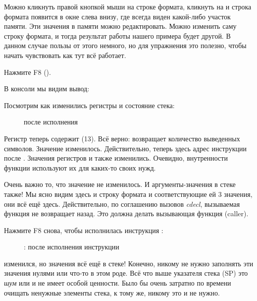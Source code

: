Можно кликнуть правой кнопкой мыши на строке формата, кликнуть на 
и строка формата появится в окне слева внизу, где всегда виден какой-либо участок памяти.
Эти значения в памяти можно редактировать.
Можно изменить саму строку формата, и тогда результат работы нашего примера будет другой.
В данном случае пользы от этого немного, но для упражнения это полезно,
чтобы начать чувствовать как тут всё работает.

\clearpage
Нажмите F8 (\stepover).

В консоли мы видим вывод:



Посмотрим как изменились регистры и состояние стека: 

\begin{figure}[H]
\centering
{}
\caption{\olly после исполнения \printf}
\label{fig:printf3_olly_3}
\end{figure}

Регистр \EAX теперь содержит  (13).
Всё верно: \printf возвращает количество выведенных символов.
Значение \EIP изменилось. Действительно, теперь здесь адрес инструкции после .
Значения регистров \ECX и \EDX также изменились.
Очевидно, внутренности функции \printf используют их для каких-то своих нужд.

Очень важно то, что значение \ESP не изменилось. И аргументы-значения в стеке также!
Мы ясно видим здесь и строку формата и соответствующие ей 3 значения, они всё ещё здесь.
Действительно, по соглашению вызовов \emph{cdecl}, вызываемая функция не возвращает \ESP назад.
Это должна делать вызывающая функция (\gls{caller}).

\clearpage
Нажмите F8 снова, чтобы исполнилась инструкция :

\begin{figure}[H]
\centering
{}
\caption{\olly: после исполнения инструкции }
\label{fig:printf3_olly_4}
\end{figure}

\ESP изменился, но значения всё ещё в стеке!
Конечно, никому не нужно заполнять эти значения нулями или что-то в этом роде.
Всё что выше указателя стека (\ac{SP}) 
это \emph{шум} или \emph{\garbage{}} и не имеет особой ценности.
Было бы очень затратно по времени очищать ненужные элементы стека, к тому же, никому это и не нужно.

